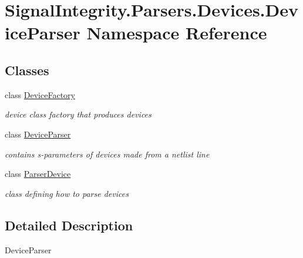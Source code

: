 \hypertarget{namespaceSignalIntegrity_1_1Parsers_1_1Devices_1_1DeviceParser}{}\section{Signal\+Integrity.\+Parsers.\+Devices.\+Device\+Parser Namespace Reference}
\label{namespaceSignalIntegrity_1_1Parsers_1_1Devices_1_1DeviceParser}
\subsection*{Classes}
\begin{DoxyCompactItemize}
\item 
class \hyperlink{classSignalIntegrity_1_1Parsers_1_1Devices_1_1DeviceParser_1_1DeviceFactory}{Device\+Factory}
\begin{DoxyCompactList}\small\item\em device class factory that produces devices \end{DoxyCompactList}\item 
class \hyperlink{classSignalIntegrity_1_1Parsers_1_1Devices_1_1DeviceParser_1_1DeviceParser}{Device\+Parser}
\begin{DoxyCompactList}\small\item\em contains s-\/parameters of devices made from a netlist line \end{DoxyCompactList}\item 
class \hyperlink{classSignalIntegrity_1_1Parsers_1_1Devices_1_1DeviceParser_1_1ParserDevice}{Parser\+Device}
\begin{DoxyCompactList}\small\item\em class defining how to parse devices \end{DoxyCompactList}\end{DoxyCompactItemize}


\subsection{Detailed Description}
\begin{DoxyVerb}DeviceParser\end{DoxyVerb}
 